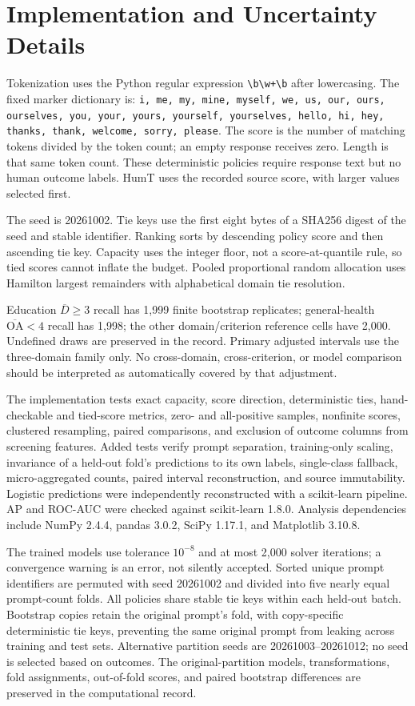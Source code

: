 \documentclass[manuscript,screen,review,anonymous]{acmart}
\newcommand{\Dcrit}{\ensuremath{\overline{D}\geq 3}}
\newcommand{\OAcrit}{\ensuremath{\overline{\mathrm{OA}}<4}}
\begin{document}
\section{Implementation and Uncertainty Details}\label{app:implementation}
Tokenization uses the Python regular expression \verb|\b\w+\b| after lowercasing. The fixed marker dictionary is: \texttt{i, me, my, mine, myself, we, us, our, ours, ourselves, you, your, yours, yourself, yourselves, hello, hi, hey, thanks, thank, welcome, sorry, please}. The score is the number of matching tokens divided by the token count; an empty response receives zero. Length is that same token count. These deterministic policies require response text but no human outcome labels. HumT uses the recorded source score, with larger values selected first.

The seed is 20261002. Tie keys use the first eight bytes of a SHA256 digest of the seed and stable identifier. Ranking sorts by descending policy score and then ascending tie key. Capacity uses the integer floor, not a score-at-quantile rule, so tied scores cannot inflate the budget. Pooled proportional random allocation uses Hamilton largest remainders with alphabetical domain tie resolution.

Education \Dcrit{} recall has 1,999 finite bootstrap replicates; general-health \OAcrit{} recall has 1,998; the other domain/criterion reference cells have 2,000. Undefined draws are preserved in the record. Primary adjusted intervals use the three-domain family only. No cross-domain, cross-criterion, or model comparison should be interpreted as automatically covered by that adjustment.

The implementation tests exact capacity, score direction, deterministic ties, hand-checkable and tied-score metrics, zero- and all-positive samples, nonfinite scores, clustered resampling, paired comparisons, and exclusion of outcome columns from screening features. Added tests verify prompt separation, training-only scaling, invariance of a held-out fold's predictions to its own labels, single-class fallback, micro-aggregated counts, paired interval reconstruction, and source immutability. Logistic predictions were independently reconstructed with a scikit-learn pipeline. AP and ROC-AUC were checked against scikit-learn 1.8.0. Analysis dependencies include NumPy 2.4.4, pandas 3.0.2, SciPy 1.17.1, and Matplotlib 3.10.8.

The trained models use tolerance $10^{-8}$ and at most 2,000 solver iterations; a convergence warning is an error, not silently accepted. Sorted unique prompt identifiers are permuted with seed 20261002 and divided into five nearly equal prompt-count folds. All policies share stable tie keys within each held-out batch. Bootstrap copies retain the original prompt's fold, with copy-specific deterministic tie keys, preventing the same original prompt from leaking across training and test sets. Alternative partition seeds are 20261003--20261012; no seed is selected based on outcomes. The original-partition models, transformations, fold assignments, out-of-fold scores, and paired bootstrap differences are preserved in the computational record.
\end{document}
